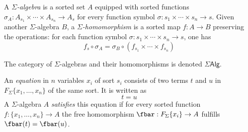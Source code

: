 \documentclass{amsart}
\begin{document}
\begin{defn}
  A \emph{$\Sigma$-algebra} is a sorted set $A$ equipped with sorted functions $\sigma_{A} : A_{s_{1}} \times \cdots \times A_{s_{n}} \to A_{s}$ for every function symbol $\sigma : s_{1} \times \cdots \times s_{n} \to s$.
  Given another $\Sigma$-algebra $B$, a \emph{$\Sigma$-homomorphism} is a sorted map $f : A \to B$ preserving the operations: for each function symbol $\sigma : s_{1} \times \cdots \times s_{n} \to s$, one has
  \[
    f_{s} \circ \sigma_{A} = \sigma_{B} \circ (f_{s_{1}} \times \cdots \times f_{s_{n}})
  \]

  The category of $\Sigma$-algebras and their homomorphisms is denoted $\Sigma\mathsf{Alg}$.
\end{defn}

\begin{defn}
  An \emph{equation} in $n$ variables $x_{i}$ of sort $s_{i}$ consists of two terms $t$ and $u$ in $F_{\Sigma}\{x_{1},\ldots,x_{n}\}$ of the same sort.
  It is written as
  \[
    t = u
  \]
  A $\Sigma$-algebra $A$ \emph{satisfies} this equation if for every sorted function $f : \{x_{1},\ldots,x_{n}\} \to A$ the free homomorphism $\fbar : F_{\Sigma}\{x_{i}\} \to A$ fulfills $\fbar(t) = \fbar(u)$.
\end{defn}



\end{document}
